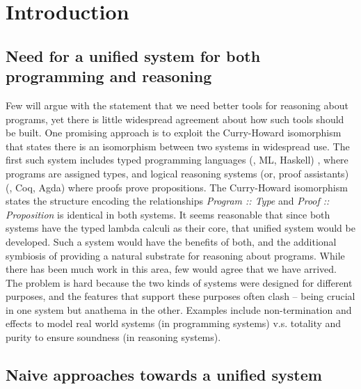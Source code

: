 \section{Introduction}

\subsection{Need for a unified system for both programming and reasoning}


Few will argue with the statement that we need better tools for reasoning about
programs, yet there is little widespread agreement about how such tools should be built.
One promising approach is to exploit the Curry-Howard isomorphism that states there is an
isomorphism between two systems in widespread use. The first such system  includes
typed programming languages (\eg, ML, Haskell) , where programs are assigned types, and
logical reasoning systems (or, proof assistants) (\eg, Coq, Agda) where proofs prove
propositions. The Curry-Howard isomorphism states the structure encoding the
relationships {\it Program :: Type} and {\it Proof :: Proposition} is identical in both
systems. It seems reasonable that since both systems have the typed lambda calculi as
their core, that unified system would be developed. Such a system would have the
benefits of both, and the additional symbiosis of providing a natural substrate for
reasoning about programs. While there has been much work in this area, few
would agree that we have arrived. The problem is hard because the two kinds of
systems were designed for different purposes, and the features that support
these purposes often clash -- being crucial in one system but anathema in the other.
Examples include non-termination and effects to model
real world systems (in programming systems) v.s.
totality and purity to ensure soundness (in reasoning systems).



\subsection{Naive approaches towards a unified system}


